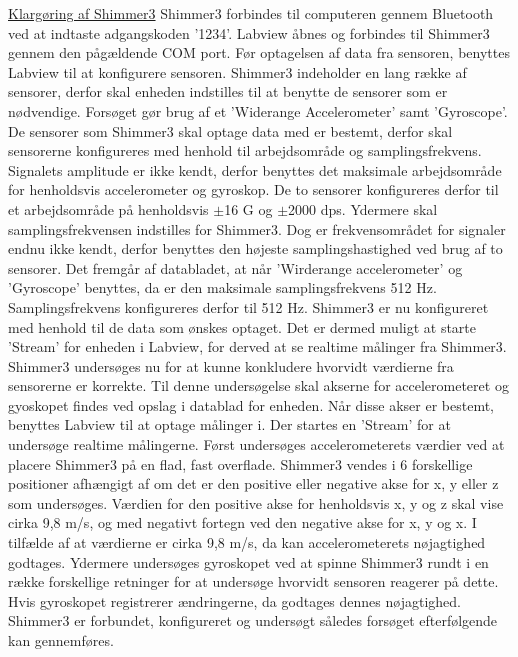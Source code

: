 \underline{Klargøring af Shimmer3}\newline
Shimmer3 forbindes til computeren gennem Bluetooth ved at indtaste adgangskoden ’1234’.  \newline
Labview åbnes og forbindes til Shimmer3 gennem den pågældende COM port. Før optagelsen af data fra sensoren, benyttes Labview til at konfigurere sensoren. Shimmer3 indeholder en lang række af sensorer, derfor skal enheden indstilles til at benytte de sensorer som er nødvendige. Forsøget gør brug af et ’Widerange Accelerometer’ samt ’Gyroscope’. De sensorer som Shimmer3 skal optage data med er bestemt, derfor skal sensorerne konfigureres med henhold til arbejdsområde og samplingsfrekvens. Signalets amplitude er ikke kendt, derfor benyttes det maksimale arbejdsområde for henholdsvis accelerometer og gyroskop. De to sensorer konfigureres derfor til et arbejdsområde på henholdsvis $\pm$16 G og $\pm$2000 dps. Ydermere skal samplingsfrekvensen indstilles for Shimmer3. Dog er frekvensområdet for signaler endnu ikke kendt, derfor benyttes den højeste samplingshastighed ved brug af to sensorer. Det fremgår af databladet, at når ’Wirderange accelerometer’ og ’Gyroscope’ benyttes, da er den maksimale samplingsfrekvens 512 Hz. Samplingsfrekvens konfigureres derfor til 512 Hz. \newline
Shimmer3 er nu konfigureret med henhold til de data som ønskes optaget. Det er dermed muligt at starte ’Stream’ for enheden i Labview, for derved at se realtime målinger fra Shimmer3. \newline
Shimmer3 undersøges nu for at kunne konkludere hvorvidt værdierne fra sensorerne er korrekte. Til denne undersøgelse skal akserne for accelerometeret og gyoskopet findes ved opslag i datablad for enheden. Når disse akser er bestemt, benyttes Labview til at optage målinger i. Der startes en ’Stream’ for at undersøge realtime målingerne.
Først undersøges accelerometerets værdier ved at placere Shimmer3 på en flad, fast overflade. Shimmer3 vendes i 6 forskellige positioner afhængigt af om det er den positive eller negative akse for x, y eller z som undersøges. Værdien for den positive akse for henholdsvis x, y og z skal vise cirka 9,8 m/s, og med negativt fortegn ved den negative akse for x, y og x. I tilfælde af at værdierne er cirka 9,8 m/s, da kan accelerometerets nøjagtighed godtages. Ydermere undersøges gyroskopet ved at spinne Shimmer3 rundt i en række forskellige retninger for at undersøge hvorvidt sensoren reagerer på dette. Hvis gyroskopet registrerer ændringerne, da godtages dennes nøjagtighed. 
 \newline
Shimmer3 er forbundet, konfigureret og undersøgt således forsøget efterfølgende kan gennemføres.

